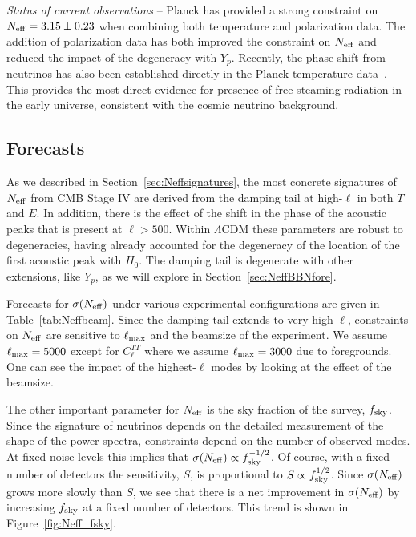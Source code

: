 {\it Status of current observations} -- Planck has provided a strong constraint on $N_{\rm eff} = 3.15 \pm 0.23$ when combining both temperature and polarization data.  The addition of polarization data has both improved the constraint on $N_{\rm eff}$ and reduced the impact of the degeneracy with $Y_p$.  Recently, the phase shift from neutrinos has also been established directly in the Planck temperature data~\cite{Follin:2015hya}.  This provides the most direct evidence for presence of free-steaming radiation in the early universe, consistent with the cosmic neutrino background.


\subsection{Forecasts}\label{sec:neff_forcast}

As we described in Section~\ref{sec:Neffsignatures}, the most concrete signatures of $N_{\rm eff}$ from CMB Stage IV are derived from the damping tail at high-$\ell$ in both $T$ and $E$.  In addition, there is the effect of the shift in the phase of the acoustic peaks that is present at $\ell > 500$.  Within $\Lambda$CDM these parameters are robust to degeneracies, having already accounted for the degeneracy of the location of the first acoustic peak with $H_0$.  The damping tail is degenerate with other extensions, like $Y_p$, as we will explore in Section~\ref{sec:NeffBBNfore}.

Forecasts for $\sigma(N_{\rm eff})$ under various experimental configurations are given in Table~\ref{tab:Neffbeam}.  Since the damping tail extends to very high-$\ell$, constraints on $N_{\rm eff}$ are sensitive to $\ell_{\rm max}$ and the beamsize of the experiment.  We assume $\ell_{\rm max} = 5000$ except for $C^{TT}_{\ell}$ where we assume $\ell_{\rm max} = 3000$ due to foregrounds.  One can see the impact of the highest-$\ell$ modes  by looking at the effect of the beamsize.

The other important parameter for $N_{\rm eff}$ is the sky fraction of the survey, $f_{\rm sky}$.  Since the signature of neutrinos depends on the detailed measurement of the shape of the power spectra, constraints depend on the number of observed modes.  At fixed noise levels this implies that $\sigma(N_{\rm eff}) \propto f^{-1/2}_{\rm sky}$.  Of course, with a fixed number of detectors the sensitivity, $S$, is proportional to $S \propto f_{\rm sky}^{1/2}$.  Since $\sigma(N_{\rm eff})$ grows more slowly than $S$, we see that there is a net improvement in $\sigma(N_{\rm eff})$ by increasing $f_{\rm sky}$ at a fixed number of detectors.  This trend is shown in Figure~\ref{fig:Neff_fsky}.


